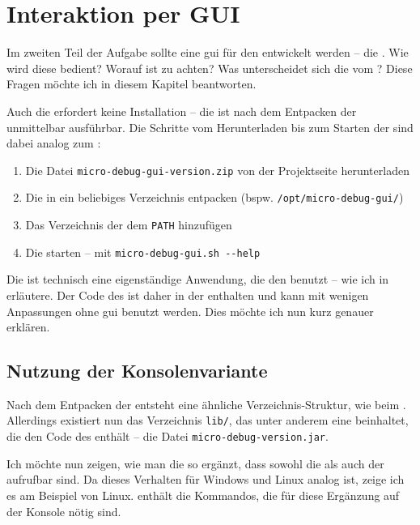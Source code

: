 \chapter{Interaktion per GUI}
Im zweiten Teil der Aufgabe sollte eine \gls{gui} für den \md entwickelt werden -- die \mdg. Wie wird diese bedient? Worauf ist zu achten? Was unterscheidet sich die \mdg vom \md? Diese Fragen möchte ich in diesem Kapitel beantworten.%

Auch die \mdg erfordert keine Installation -- die \mdg ist nach dem Entpacken der  unmittelbar ausführbar. Die Schritte vom Herunterladen bis zum Starten der \mdg sind dabei analog zum \md:

\begin{enumerate}
\item Die Datei \texttt{micro-debug-gui-version.zip} von der Projektseite \cite{Roesch2012gui} herunterladen
\item Die  in ein beliebiges Verzeichnis entpacken (bspw. \texttt{/opt/micro-debug-gui/})
\item Das Verzeichnis der \mdg dem \texttt{PATH} hinzufügen
\item Die \mdg starten -- mit \texttt{micro-debug-gui.sh~-{}-help}
\end{enumerate}

Die \mdg ist technisch eine eigenständige Anwendung, die den \md benutzt -- wie ich in  erläutere. Der Code des \md ist daher in der \mdg enthalten und kann mit wenigen Anpassungen ohne \gls{gui} benutzt werden. Dies möchte ich nun kurz genauer erklären.

\section{Nutzung der Konsolenvariante}
Nach dem Entpacken der  entsteht eine ähnliche Verzeichnis-Struktur, wie beim \md. Allerdings existiert nun das Verzeichnis \texttt{lib/}, das unter anderem eine  beinhaltet, die den Code des \md enthält -- die Datei \texttt{micro-debug-version.jar}.

Ich möchte nun zeigen, wie man die \mdg so ergänzt, dass sowohl die \mdg als auch der \md aufrufbar sind. Da dieses Verhalten für Windows und Linux analog ist, zeige ich es am Beispiel von Linux.  enthält die Kommandos, die für diese Ergänzung auf der Konsole nötig sind.

